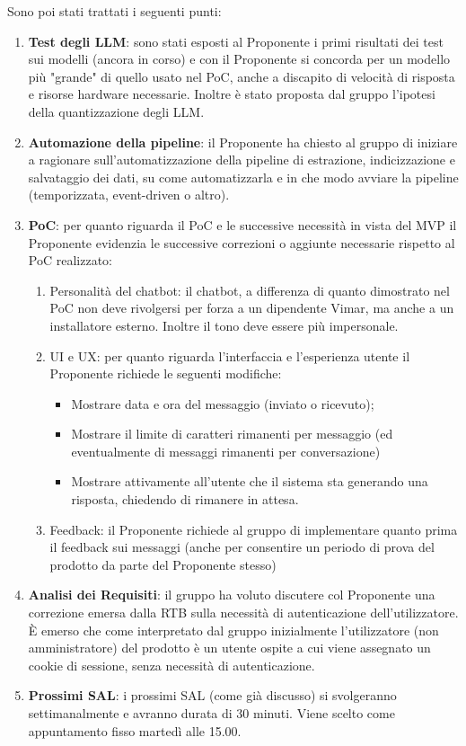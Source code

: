  
\noindent Sono poi stati trattati i seguenti punti:
\begin{enumerate}
    \item \textbf{Test degli LLM}: sono stati esposti al Proponente i primi risultati dei test sui modelli (ancora in corso) e con il Proponente si concorda per un modello più "grande" di quello usato nel PoC, anche a discapito di velocità di risposta e risorse hardware necessarie. Inoltre è stato proposta dal gruppo l'ipotesi della quantizzazione degli LLM.
    \item \textbf{Automazione della pipeline}: il Proponente ha chiesto al gruppo di iniziare a ragionare sull'automatizzazione della pipeline di estrazione, indicizzazione e salvataggio dei dati, su come automatizzarla e in che modo avviare la pipeline (temporizzata, event-driven o altro).
    \item \textbf{PoC}: per quanto riguarda il PoC e le successive necessità in vista del MVP il Proponente evidenzia le successive correzioni o aggiunte necessarie rispetto al PoC realizzato:
        \begin{enumerate}
            \item Personalità del chatbot: il chatbot, a differenza di quanto dimostrato nel PoC non deve rivolgersi per forza a un dipendente Vimar, ma anche a un installatore esterno. Inoltre il tono deve essere più impersonale.
            \item UI e UX: per quanto riguarda l'interfaccia e l'esperienza utente il Proponente richiede le seguenti modifiche:
                \begin{itemize}
                \item Mostrare data e ora del messaggio (inviato o ricevuto);
                \item Mostrare il limite di caratteri rimanenti per messaggio (ed eventualmente di messaggi rimanenti per conversazione)
                \item Mostrare attivamente all'utente che il sistema sta generando una risposta, chiedendo di rimanere in attesa.
                \end{itemize}
            \item Feedback: il Proponente richiede al gruppo di implementare quanto prima il feedback sui messaggi (anche per consentire un periodo di prova del prodotto da parte del Proponente stesso)
        \end{enumerate}
    \item \textbf{Analisi dei Requisiti}: il gruppo ha voluto discutere col Proponente una correzione emersa dalla RTB sulla necessità di autenticazione dell'utilizzatore. È emerso che come interpretato dal gruppo inizialmente l'utilizzatore (non amministratore) del prodotto è un utente ospite a cui viene assegnato un cookie di sessione, senza necessità di autenticazione.
    \item \textbf{Prossimi SAL}: i prossimi SAL (come già discusso) si svolgeranno settimanalmente e avranno durata di 30 minuti. Viene scelto come appuntamento fisso martedì alle 15.00.
\end{enumerate}
